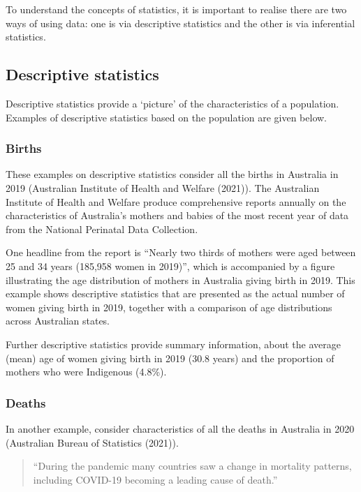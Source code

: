 \documentclass[
  a4paper,
]{memoir}
\begin{document}
To understand the concepts of statistics, it is important to realise
there are two ways of using data: one is via descriptive statistics and
the other is via inferential statistics.

\hypertarget{descriptive-statistics}{%
\subsection{Descriptive statistics}\label{descriptive-statistics}}

Descriptive statistics provide a `picture' of the characteristics of a
population. Examples of descriptive statistics based on the population
are given below.

\hypertarget{births}{%
\subsubsection{Births}\label{births}}

These examples on descriptive statistics consider all the births in
Australia in 2019 (Australian Institute of Health and Welfare (2021)).
The Australian Institute of Health and Welfare produce comprehensive
reports annually on the characteristics of Australia's mothers and
babies of the most recent year of data from the National Perinatal Data
Collection.

One headline from the report is ``Nearly two thirds of mothers were aged
between 25 and 34 years (185,958 women in 2019)'', which is accompanied
by a figure illustrating the age distribution of mothers in Australia
giving birth in 2019. This example shows descriptive statistics that are
presented as the actual number of women giving birth in 2019, together
with a comparison of age distributions across Australian states.

Further descriptive statistics provide summary information, about the
average (mean) age of women giving birth in 2019 (30.8 years) and the
proportion of mothers who were Indigenous (4.8\%).

\hypertarget{deaths}{%
\subsubsection{Deaths}\label{deaths}}

In another example, consider characteristics of all the deaths in
Australia in 2020 (Australian Bureau of Statistics (2021)).

\begin{quote}
``During the pandemic many countries saw a change in mortality patterns,
including COVID-19 becoming a leading cause of death.''
\end{quote}
\end{document}
